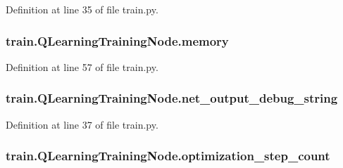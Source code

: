 Definition at line 35 of file train.\+py.

\subsubsection[{\texorpdfstring{memory}{memory}}]{\setlength{\rightskip}{0pt plus 5cm}train.\+Q\+Learning\+Training\+Node.\+memory}\hypertarget{classtrain_1_1_q_learning_training_node_a49440485cce2f2f3fe9575456a562098}{}\label{classtrain_1_1_q_learning_training_node_a49440485cce2f2f3fe9575456a562098}


Definition at line 57 of file train.\+py.

\subsubsection[{\texorpdfstring{net\+\_\+output\+\_\+debug\+\_\+string}{net_output_debug_string}}]{\setlength{\rightskip}{0pt plus 5cm}train.\+Q\+Learning\+Training\+Node.\+net\+\_\+output\+\_\+debug\+\_\+string}\hypertarget{classtrain_1_1_q_learning_training_node_a5837c478232e1d4cc646bfbadbdd2ff2}{}\label{classtrain_1_1_q_learning_training_node_a5837c478232e1d4cc646bfbadbdd2ff2}


Definition at line 37 of file train.\+py.

\subsubsection[{\texorpdfstring{optimization\+\_\+step\+\_\+count}{optimization_step_count}}]{\setlength{\rightskip}{0pt plus 5cm}train.\+Q\+Learning\+Training\+Node.\+optimization\+\_\+step\+\_\+count}\hypertarget{classtrain_1_1_q_learning_training_node_a876c1cedd4eabcca4e9a0ee6e0922752}{}\label{classtrain_1_1_q_learning_training_node_a876c1cedd4eabcca4e9a0ee6e0922752}


